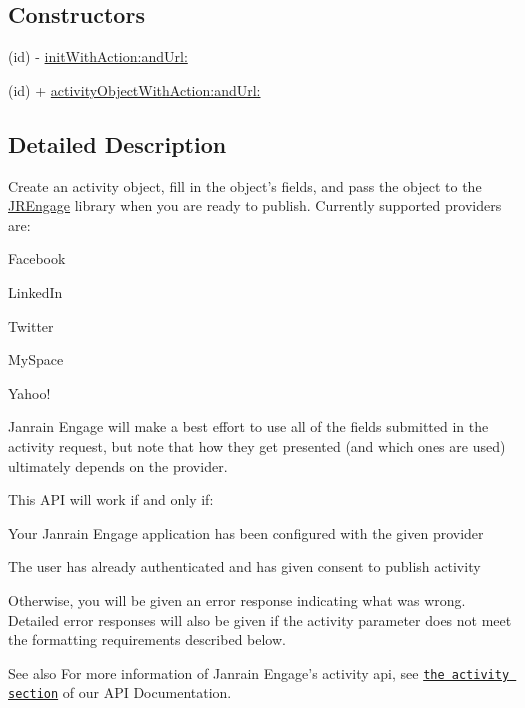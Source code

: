 \subsection*{Constructors}
\label{_amgrp559a25fdb98a7d1fd1c3771ac568d5e9}
 \begin{DoxyCompactItemize}
\item 
(id) -\/ \hyperlink{interface_j_r_activity_object_a61195dc95162d1136d41af3a5f15fe2d}{initWithAction:andUrl:}
\item 
(id) + \hyperlink{interface_j_r_activity_object_a7bfe16e0799ff6c07548ef8aeb778a51}{activityObjectWithAction:andUrl:}
\end{DoxyCompactItemize}


\subsection{Detailed Description}
Create an activity object, fill in the object's fields, and pass the object to the \hyperlink{interface_j_r_engage}{JREngage} library when you are ready to publish. Currently supported providers are:
\begin{DoxyItemize}
\item Facebook
\item LinkedIn
\item Twitter
\item MySpace
\item Yahoo!
\end{DoxyItemize}

Janrain Engage will make a best effort to use all of the fields submitted in the activity request, but note that how they get presented (and which ones are used) ultimately depends on the provider.

This API will work if and only if:
\begin{DoxyItemize}
\item Your Janrain Engage application has been configured with the given provider
\item The user has already authenticated and has given consent to publish activity
\end{DoxyItemize}

Otherwise, you will be given an error response indicating what was wrong. Detailed error responses will also be given if the activity parameter does not meet the formatting requirements described below.

\begin{DoxySeeAlso}{See also}
For more information of Janrain Engage's activity api, see \href{https://rpxnow.com/docs#api_activity}{\tt the activity section} of our API Documentation. 
\end{DoxySeeAlso}


